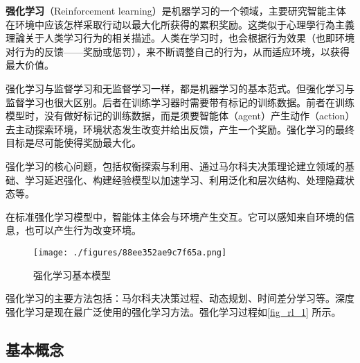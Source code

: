 
\textbf{强化学习}（Reinforcement learning）是机器学习的一个领域，主要研究智能主体在环境中应该怎样采取行动以最大化所获得的累积奖励。这类似于心理學行為主義理論关于人类学习行为的相关描述。人类在学习时，也会根据行为效果（也即环境对行为的反馈——奖励或惩罚），来不断调整自己的行为，从而适应环境，以获得最大价值。

强化学习与监督学习和无监督学习一样，都是机器学习的基本范式。但强化学习与监督学习也很大区别。后者在训练学习器时需要带有标记的训练数据。前者在训练模型时，没有做好标记的训练数据，而是须要智能体（agent）产生动作（action）去主动探索环境，环境状态发生改变并给出反馈，产生一个奖励。强化学习的最终目标是尽可能使得奖励最大化。

强化学习的核心问题，包括权衡探索与利用、通过马尔科夫决策理论建立领域的基础、学习延迟强化、构建经验模型以加速学习、利用泛化和层次结构、处理隐藏状态等。

在标准强化学习模型中，智能体主体会与环境产生交互。它可以感知来自环境的信息，也可以产生行为改变环境。

\begin{figure}[ht]
\centering
\texttt{[image: ./figures/88ee352ae9c7f65a.png]}
\caption{强化学习基本模型} \label{fig_rl_1}
\end{figure}

强化学习的主要方法包括：马尔科夫决策过程、动态规划、时间差分学习等。深度强化学习是现在最广泛使用的强化学习方法。强化学习过程如\autoref{fig_rl_1} 所示。

\subsection{基本概念}

